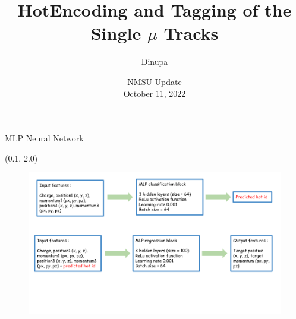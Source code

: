 \documentclass[12pt, xcolor={dvipsnames}, aspectratio = 169]{beamer}
\title{HotEncoding and Tagging of the Single $\mu$ Tracks}
\author{Dinupa}
\date{NMSU Update
\\ October 11, 2022 }
\begin{document}
\begin{frame}
    \maketitle
\end{frame}


\begin{frame}{MLP Neural Network}
\begin{textblock}{14.0}(0.1, 2.0)
    \begin{figure}
        \centering
        \includegraphics[width=14.0cm]{../imgs/flow-chart.png}
    \end{figure}
\end{textblock}
\end{frame}
\end{document}
